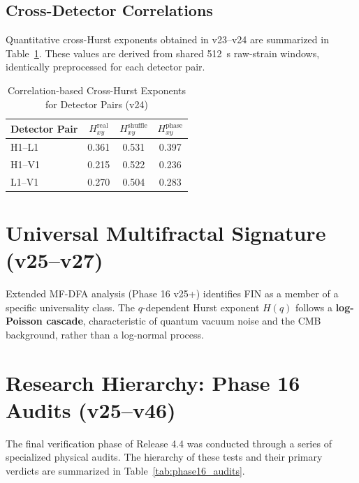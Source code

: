 \documentclass[11pt,a4paper]{book}
\theoremstyle{remark}
\begin{document}
\subsection{Cross-Detector Correlations}
Quantitative cross-Hurst exponents obtained in v23--v24 are summarized in Table~\ref{tab:cross_hurst_numbers}. These values are derived from shared 512~s raw-strain windows, identically preprocessed for each detector pair.

\begin{table}[H]
\centering
\caption{Correlation-based Cross-Hurst Exponents for Detector Pairs (v24)}
\label{tab:cross_hurst_numbers}
\begin{tabular}{lccc}
\toprule
Detector Pair & $H_{xy}^{\mathrm{real}}$ & $H_{xy}^{\mathrm{shuffle}}$ & $H_{xy}^{\mathrm{phase}}$ \\
\midrule
H1--L1 & 0.361 & 0.531 & 0.397 \\
H1--V1 & 0.215 & 0.522 & 0.236 \\
L1--V1 & 0.270 & 0.504 & 0.283 \\
\bottomrule
\end{tabular}
\end{table}

\section{Universal Multifractal Signature (v25--v27)}
Extended MF-DFA analysis (Phase 16 v25+) identifies FIN as a member of a specific universality class. The $q$-dependent Hurst exponent $H(q)$ follows a \textbf{log-Poisson cascade}, characteristic of quantum vacuum noise and the CMB background, rather than a log-normal process.

\section{Research Hierarchy: Phase 16 Audits (v25--v46)}
The final verification phase of Release 4.4 was conducted through a series of specialized physical audits. The hierarchy of these tests and their primary verdicts are summarized in Table~\ref{tab:phase16_audits}.
\end{document}
